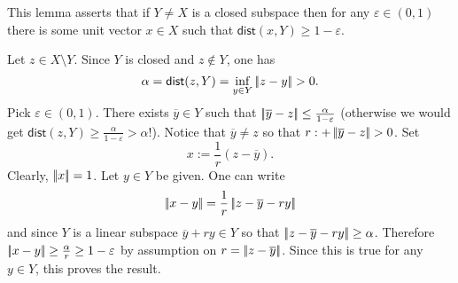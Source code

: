 \documentclass{article}
\begin{document}
\begin{remark}
	This lemma asserts that if $Y\neq X$ is a closed subspace then for any $\varepsilon\in(0,1)$ there is some unit vector $x\in X$ such that $\mathsf{dist}(x,Y)\geq 1-\varepsilon$.
\end{remark}
\begin{fancyproof}
	Let $z\in X\setminus Y$. Since $Y$ is closed and $z\notin Y$, one has
	\begin{equation*}
		\alpha=\mathsf{dist}(z,Y)=\inf_{y\in Y}\norm{z-y}>0.
	\end{equation*}
	Pick $\varepsilon\in(0,1)$. There exists $\overline{y}\in Y$ such that $\left|\negthinspace\left|\overline{y}-z\right|\negthinspace\right|\leq\frac{\alpha}{1-\varepsilon}$ (otherwise we would get $\mathsf{dist}(z,Y)\geq\frac{\alpha}{1-\varepsilon}>\alpha$!). Notice that $\overline{y}\neq z$ so that $r:+\norm{\overline{y}-z}>0$. Set 
	\begin{equation*}
		x:=\frac{1}{r}(z-\overline{y}).
	\end{equation*}
	Clearly, $\left|\negthinspace\left|x\right|\negthinspace\right|=1$. Let $y\in Y$ be given. One can write
	\begin{equation*}
		\left|\negthinspace\left|x-y\right|\negthinspace\right|=\frac{1}{r}\left|\negthinspace\left|z-\overline{y}-ry\right|\negthinspace\right|
	\end{equation*}
	and since $Y$ is a linear subspace $\overline{y}+ry\in Y$ so that $\left|\negthinspace\left|z-\overline{y}-ry\right|\negthinspace\right|\geq \alpha$. Therefore $\left|\negthinspace\left|x-y\right|\negthinspace\right|\geq\frac{\alpha}{r}\geq 1-\varepsilon$ by assumption on $r=\left|\negthinspace\left|z-\overline{y}\right|\negthinspace\right|$. Since this is true for any $y\in Y$, this proves the result.
\end{fancyproof}
\end{document}
